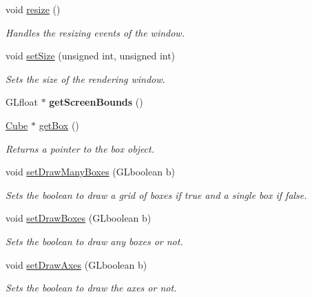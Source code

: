 \begin{DoxyCompactItemize}
void \hyperlink{class_graphics_engine_a6a38e40ee4227a8b53dddf07f92323ee}{resize} ()
\begin{DoxyCompactList}\small\item\em Handles the resizing events of the window. \end{DoxyCompactList}\item 
void \hyperlink{class_graphics_engine_aac1a9cc3d195ed1f28018dffd80dae41}{set\+Size} (unsigned int, unsigned int)
\begin{DoxyCompactList}\small\item\em Sets the size of the rendering window. \end{DoxyCompactList}\item 
\mbox{\label{class_graphics_engine_a95a17b256079f26ca2b73ec3210317d2}} 
G\+Lfloat $\ast$ {\bfseries get\+Screen\+Bounds} ()
\item 
\mbox{\label{class_graphics_engine_a4f7faa74e2864431263006c70559ab9c}} 
\hyperlink{class_cube}{Cube} $\ast$ \hyperlink{class_graphics_engine_a4f7faa74e2864431263006c70559ab9c}{get\+Box} ()
\begin{DoxyCompactList}\small\item\em Returns a pointer to the box object. \end{DoxyCompactList}\item 
void \hyperlink{class_graphics_engine_ac1e139e3fb1cc18560f085f752ef871b}{set\+Draw\+Many\+Boxes} (G\+Lboolean b)
\begin{DoxyCompactList}\small\item\em Sets the boolean to draw a grid of boxes if true and a single box if false. \end{DoxyCompactList}\item 
void \hyperlink{class_graphics_engine_abe5ac289b57dbb1b2270efbeeeccda04}{set\+Draw\+Boxes} (G\+Lboolean b)
\begin{DoxyCompactList}\small\item\em Sets the boolean to draw any boxes or not. \end{DoxyCompactList}\item 
void \hyperlink{class_graphics_engine_abc1591d1873ad66188c5b7613606e8ab}{set\+Draw\+Axes} (G\+Lboolean b)
\begin{DoxyCompactList}\small\item\em Sets the boolean to draw the axes or not. \end{DoxyCompactList}\item 

\end{DoxyCompactItemize}
